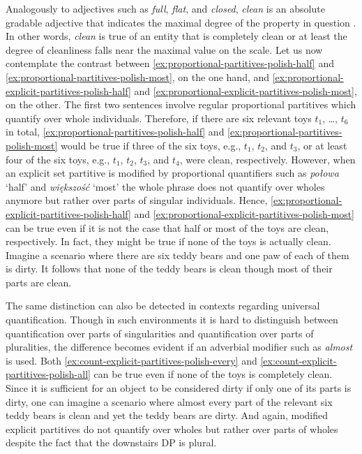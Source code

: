 Analogously to adjectives such as \textit{full}, \textit{flat}, and \textit{closed}, \textit{clean} is an absolute gradable adjective that indicates the maximal degree of the property in question \citep{unger1975ignorance,kennedy_mcnally2005scale}. In other words, \textit{clean} is true of an entity that is completely clean or at least the degree of cleanliness falls near the maximal value on the scale. Let us now contemplate the contrast between \ref{ex:proportional-partitives-polish-half} and \ref{ex:proportional-partitives-polish-most}, on the one hand, and \ref{ex:proportional-explicit-partitives-polish-half} and \ref{ex:proportional-explicit-partitives-polish-most}, on the other. The first two sentences involve regular proportional partitives which quantify over whole individuals. Therefore, if there are six relevant toys $t_1$, \dots, $t_6$ in total, \ref{ex:proportional-partitives-polish-half} and \ref{ex:proportional-partitives-polish-most} would be true if three of the six toys, e.g., $t_1$, $t_2$, and $t_3$, or at least four of the six toys, e.g., $t_1$, $t_2$, $t_3$, and $t_4$, were clean, respectively. However, when an explicit set partitive is modified by proportional quantifiers such as \textit{połowa} `half' and \textit{większość} `most' the whole phrase does not quantify over wholes anymore but rather over parts of singular individuals. Hence, \ref{ex:proportional-explicit-partitives-polish-half} and \ref{ex:proportional-explicit-partitives-polish-most} can be true even if it is not the case that half or most of the toys are clean, respectively. In fact, they might be true if none of the toys is actually clean. Imagine a scenario where there are six teddy bears and one paw of each of them is dirty. It follows that none of the teddy bears is clean though most of their parts are clean.

The same distinction can also be detected in contexts regarding universal quantification. Though in such environments it is hard to distinguish between quantification over parts of singularities and quantification over parts of pluralities, the difference becomes evident if an adverbial modifier such as \textit{almost} is used. Both \ref{ex:count-explicit-partitives-polish-every} and \ref{ex:count-explicit-partitives-polish-all} can be true even if none of the toys is completely clean. Since it is sufficient for an object to be considered dirty if only one of its parts is dirty, one can imagine a scenario where almost every part of the relevant six teddy bears is clean and yet the teddy bears are dirty. And again, modified explicit partitives do not quantify over wholes but rather over parts of wholes despite the fact that the downstairs DP is plural.

